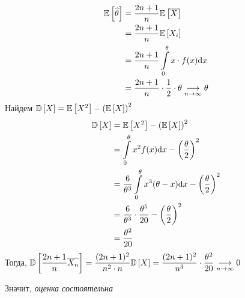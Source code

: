 \documentclass{article}
\begin{document}
\begin{equation*}
    \begin{aligned}
        \mathbb{E}\left[\widehat{\theta}\right]&=\frac{2n+1}{n}\mathbb{E}\left[\overline{X}\right]\\
        &=\frac{2n+1}{n}\mathbb{E}\left[X_i\right]\\
        &=\frac{2n+1}{n}\int\limits_0^{\theta}x\cdot f(x)\text{d}x\\
        &=\frac{2n+1}{n}\cdot\frac{1}{2}\cdot\theta\underset{n\to\infty}{\longrightarrow}\theta
    \end{aligned}
\end{equation*}
Найдем $\mathbb{D}\left[X\right]=\mathbb{E}\left[X^2\right]-\left(\mathbb{E}\left[X\right]\right)^2$
\begin{equation*}
    \begin{aligned}
        \mathbb{D}\left[X\right]&=\mathbb{E}\left[X^2\right]-\left(\mathbb{E}\left[X\right]\right)^2\\
        &=\int\limits_{0}^{\theta}x^2f(x)\text{d}x-\left(\frac{\theta}{2}\right)^2\\
        &=\frac{6}{\theta^3}\int\limits_{0}^{\theta}x^3(\theta-x)\text{d}x-\left(\frac{\theta}{2}\right)^2\\
        &=\frac{6}{\theta^3}\cdot\frac{\theta^5}{20}-\left(\frac{\theta}{2}\right)^2\\
        &=\frac{\theta^2}{20}
    \end{aligned}
\end{equation*}
Тогда, $\mathbb{D}\left[\displaystyle\frac{2n+1}{n}\overline{X_n}\right]=\displaystyle\frac{(2n+1)^2}{n^2\cdot n}\mathbb{D}\left[X\right]=\displaystyle\frac{(2n+1)^2}{n^3}\cdot\frac{\theta^2}{20}\underset{n\to\infty}{\longrightarrow}0$

Значит, \textit{оценка состоятельна}
\end{document}
